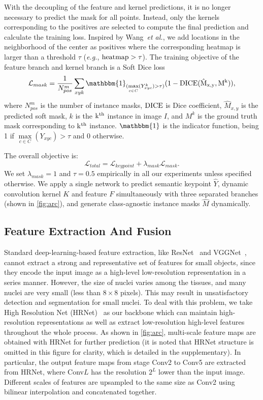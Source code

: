 \documentclass[lettersize,journal]{IEEEtran}
\newcommand{\etal}{{\textit{et al.}}}
\newcommand{\eg}{{\textit{e.g.}}, }
\begin{document}
With the decoupling of the feature and kernel predictions, it is no longer necessary to predict the mask for all points. Instead, only the kernels corresponding to the positives are selected to compute the final prediction and calculate the training loss. Inspired by Wang~\etal\cite{solo}, we add locations in the neighborhood of the center as positives where the corresponding heatmap is larger than a threshold $\tau$ (\eg $ \rm{heatmap}>\tau$). The training objective of the feature branch and kernel branch is a Soft Dice loss~\cite{vnet}
\begin{equation*}
\mathcal{L}_{mask}=\frac{1}{N_{pos}^m}\sum_{xyk}\mathbbm{1}_{(\underset{c \in C}{\max}(Y_{xyc}^k)>\tau)}(1-\rm{DICE}( \hat{M}_{x,y},M^k)),
\end{equation*}
where $N_{pos}^m$ is the number of instance masks, $\rm DICE$ is Dice coefficient, $\hat{M}_{x,y}$ is the predicted soft mask, $k$ is the $\rm k^{\text{th}}$ instance in image $I$, and ${M}^{k}$ is the ground truth mask corresponding to $\rm k^{\text{th}}$ instance. $\mathbbm{1}$ is the indicator function, being 1 if $\underset{c \in C}{\max}(Y_{xyc})>\tau$ and 0 otherwise.

The overall objective is:
\begin{equation*}
\mathcal{L}_{total}=\mathcal{L}_{keypoint}+\lambda_{mask}\mathcal{L}_{mask}.
\end{equation*}
We set $\lambda_{mask}=1$ and $\tau=0.5$ empirically in all our experiments unless specified otherwise. We apply a single network to predict semantic keypoint $\hat{Y}$, dynamic convolution kernel $K$ and feature $F$ simultaneously with three separated branches (shown in \autoref{fig:arc}), and generate class-agnostic instance masks $\hat{M}$ dynamically. 

\subsection{Feature Extraction And Fusion}
Standard deep-learning-based feature extraction, like ResNet~\cite{he2016identity} and VGGNet~\cite{simonyan2018very}, cannot extract a strong and representative set of features for small objects, since they encode the input image as a high-level low-resolution representation in a series manner. However, the size of nuclei varies among the tissues, and many nuclei are very small (less than $8\times 8$ pixels). This may result in unsatisfactory detection and segmentation  for small nuclei. To deal with this problem, we take High Resolution Net (HRNet)~\cite{hrnet} as our backbone which can maintain high-resolution representations as well as extract low-resolution high-level features throughout the whole process. As shown in \autoref{fig:arc}, multi-scale feature maps are obtained with HRNet for further prediction (it is noted that HRNet structure is omitted in this figure for clarity, which is detailed in the supplementary). In particular, the output feature maps from stage Conv2 to Conv5 are extracted from HRNet, where Conv$L$ has the resolution $2^L$ lower than the input image. Different scales of features are upsampled to the same size as Conv2 using bilinear interpolation and concatenated together.
\end{document}
